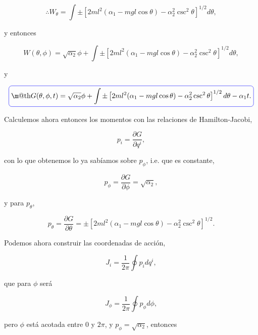 \documentclass[a4paper,10pt]{article}
\makeatletter
\numberwithin{equation}{section}
\newcommand*{\boxcolor}{blue}
\renewcommand{\boxed}[1]{\textcolor{\boxcolor}{%
\tikz[baseline={([yshift=-1ex]current bounding box.center)}] \node [rectangle, minimum width=1ex,rounded corners,draw] {\normalcolor\m@th$\displaystyle#1$};}}
\makeatother
\begin{document}
\begin{equation}
 \therefore W_\theta = \int \pm \left[
 2ml^2(\alpha_1 - mgl\cos{\theta}) -  \alpha_2^2\csc^2{\theta}\right]^{1/2} d\theta,
\end{equation}

y entonces 

\begin{equation}
 W(\theta,\phi) = \sqrt{\alpha_2}\phi + \int \pm \left[
 2ml^2(\alpha_1 - mgl\cos{\theta}) -  \alpha_2^2\csc^2{\theta}\right]^{1/2} d\theta,
\end{equation}

y 

\begin{equation}
 \boxed{G(\theta,\phi,t) = \sqrt{\alpha_2}\phi + \int \pm \left[
 2ml^2(\alpha_1 - mgl\cos{\theta}) -  \alpha_2^2\csc^2{\theta}\right]^{1/2} d\theta 
 - \alpha_1 t.}
\end{equation}

Calculemos ahora entonces los momentos con las relaciones de Hamilton-Jacobi, 

\begin{equation}
 p_i = \frac{\partial G}{\partial q^i},
\end{equation}

con lo que obtenemos lo ya sabíamos sobre $p_\phi$, i.e. que es constante, 

\begin{equation}
 p_\phi = \frac{\partial G}{\partial \phi} = \sqrt{\alpha_2},
\end{equation}

y para $p_\theta$, 

\begin{equation}
 p_\theta = \frac{\partial G}{\partial \theta} = \pm \left[
 2ml^2(\alpha_1 - mgl\cos{\theta}) -  \alpha_2^2\csc^2{\theta}\right]^{1/2}.
\end{equation}

Podemos ahora construir las coordenadas de acción, 

\begin{equation}
 J_i = \frac{1}{2\pi}\oint p_idq^i,
\end{equation}

que para $\phi$ será 

\begin{equation}
 J_\phi = \frac{1}{2\pi}\oint p_\phi d\phi,
\end{equation}

pero $\phi$ está acotada entre $0$ y $2\pi$, y $p_\phi = \sqrt{\alpha_2}$, entonces 
\end{document}
